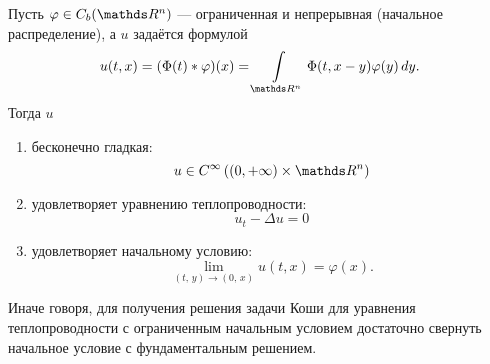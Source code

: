 \begin{theorem}
Пусть $\varphi\in C_b(\real^n)$ --- ограниченная и непрерывная (начальное распределение), а $u$ задаётся формулой
$$u(t,x) = (\Phi(t) * \varphi) (x) =  \int\limits_{\real^n}\Phi(t, x-y)\varphi(y) \, dy.$$
Тогда $u$
\begin{enumerate}
\item бесконечно гладкая: $$u \in C^\infty\left(\left(0, +\infty\right)\times \real^n\right)$$
\item удовлетворяет уравнению теплопроводности: $$ u_t - \Delta u = 0$$
\item удовлетворяет начальному условию: $$\lim\limits_{(t,\,y) \rightarrow (0,\,x)}u(t,x) = \varphi (x).$$
\end{enumerate}

Иначе говоря, для получения решения задачи Коши для уравнения теплопроводности с ограниченным начальным условием достаточно свернуть начальное условие с фундаментальным решением.
\end{theorem}

